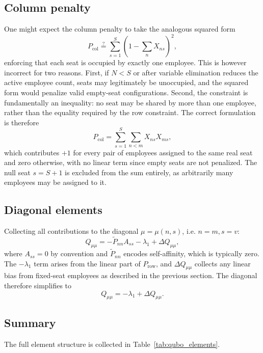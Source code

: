 \documentclass[10pt]{article}
\theoremstyle{definition}
\theoremstyle{plain}
\theoremstyle{remark}
\begin{document}
	
	\subsection{Column penalty}
	One might expect the column penalty to take the analogous squared form
	\begin{equation}
		P_\text{col} \stackrel{?}{=} \sum_{s=1}^{S} \left(1 - \sum_n X_{ns}\right)^2,
	\end{equation}
	enforcing that each seat is occupied by exactly one employee. This is however
	incorrect for two reasons. First, if $N < S$ or after variable elimination reduces
	the active employee count, seats may legitimately be unoccupied, and the squared
	form would penalize valid empty-seat configurations. Second, the constraint is
	fundamentally an inequality: no seat may be shared by more than one employee, rather than the equality required by the row constraint. The correct formulation is therefore
	\begin{equation}
		P_\text{col} = \sum_{s=1}^{S} \sum_{n < m} X_{ns} X_{ms},
	\end{equation}
	which contributes $+1$ for every pair of employees assigned to the same real seat
	and zero otherwise, with no linear term since empty seats are not penalized.
	The null seat $s = S+1$ is excluded from the sum entirely, as arbitrarily many
	employees may be assigned to it.
	
	\subsection{Diagonal elements}
	Collecting all contributions to the diagonal $\mu = \mu(n,s)$, i.e. $n=m, s=v$:
	\begin{equation}
		Q_{\mu\mu} = -\tilde{P}_{nn} A_{ss} - \lambda_1 + \Delta Q_{\mu\mu},
	\end{equation}
	where $A_{ss} = 0$ by convention and $\tilde{P}_{nn}$ encodes self-affinity, 
	which is typically zero. The $-\lambda_1$ term arises from the linear part of 
	$P_\text{row}$, and $\Delta Q_{\mu\mu}$ collects any linear bias from fixed-seat 
	employees as described in the previous section. The diagonal therefore simplifies to
	\begin{equation}
		Q_{\mu\mu} = -\lambda_1 + \Delta Q_{\mu\mu}.
	\end{equation}
	
	\subsection{Summary}
	The full element structure is collected in Table~\ref{tab:qubo_elements}.
	
\end{document}
